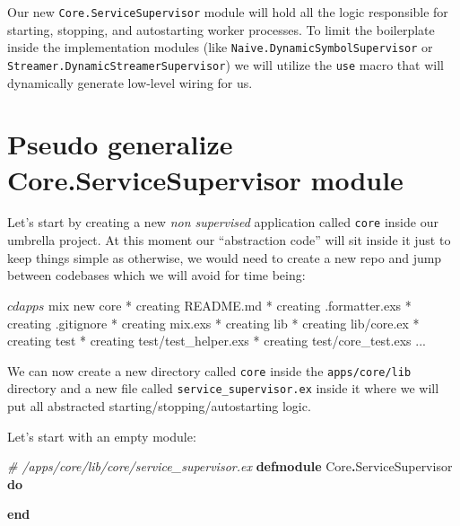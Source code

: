 \documentclass[
]{book}
\newenvironment{Shaded}{\begin{snugshade}}{\end{snugshade}}
\newcommand{\CommentTok}[1]{\textcolor[rgb]{0.56,0.35,0.01}{\textit{#1}}}
\newcommand{\ConstantTok}[1]{\textcolor[rgb]{0.00,0.00,0.00}{#1}}
\newcommand{\ExtensionTok}[1]{#1}
\newcommand{\KeywordTok}[1]{\textcolor[rgb]{0.13,0.29,0.53}{\textbf{#1}}}
\newcommand{\NormalTok}[1]{#1}
\newcommand{\OperatorTok}[1]{\textcolor[rgb]{0.81,0.36,0.00}{\textbf{#1}}}
\begin{document}
Our new \texttt{Core.ServiceSupervisor} module will hold all the logic responsible for starting, stopping, and autostarting worker processes. To limit the boilerplate inside the implementation modules (like \texttt{Naive.DynamicSymbolSupervisor} or \texttt{Streamer.DynamicStreamerSupervisor}) we will utilize the \texttt{use} macro that will dynamically generate low-level wiring for us.

\hypertarget{pseudo-generalize-core.servicesupervisor-module}{%
\section{Pseudo generalize Core.ServiceSupervisor module}\label{pseudo-generalize-core.servicesupervisor-module}}

Let's start by creating a new \emph{non supervised} application called \texttt{core} inside our umbrella project. At this moment our ``abstraction code'' will sit inside it just to keep things simple as otherwise, we would need to create a new repo and jump between codebases which we will avoid for time being:

\begin{Shaded}
\begin{Highlighting}[]
\ExtensionTok{$}\NormalTok{ cd apps}
\ExtensionTok{$}\NormalTok{ mix new core}
\ExtensionTok{*}\NormalTok{ creating README.md}
\ExtensionTok{*}\NormalTok{ creating .formatter.exs}
\ExtensionTok{*}\NormalTok{ creating .gitignore}
\ExtensionTok{*}\NormalTok{ creating mix.exs}
\ExtensionTok{*}\NormalTok{ creating lib}
\ExtensionTok{*}\NormalTok{ creating lib/core.ex}
\ExtensionTok{*}\NormalTok{ creating test}
\ExtensionTok{*}\NormalTok{ creating test/test\_helper.exs}
\ExtensionTok{*}\NormalTok{ creating test/core\_test.exs}
\ExtensionTok{...}
\end{Highlighting}
\end{Shaded}

We can now create a new directory called \texttt{core} inside the \texttt{apps/core/lib} directory and a new file called \texttt{service\_supervisor.ex} inside it where we will put all abstracted starting/stopping/autostarting logic.

Let's start with an empty module:

\begin{Shaded}
\begin{Highlighting}[]
\CommentTok{\# /apps/core/lib/core/service\_supervisor.ex}
\KeywordTok{defmodule} \ConstantTok{Core}\OperatorTok{.}\ConstantTok{ServiceSupervisor} \KeywordTok{do}

\KeywordTok{end}
\end{Highlighting}
\end{Shaded}
\end{document}
